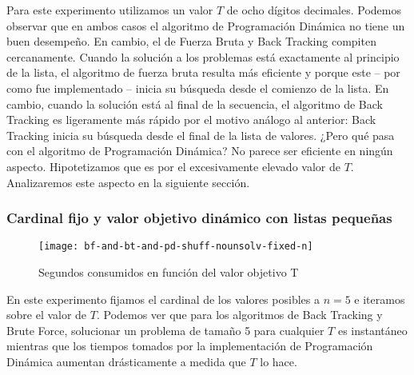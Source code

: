 Para este experimento utilizamos un valor $T$ de ocho dígitos decimales. Podemos observar que en ambos casos el algoritmo de Programación Dinámica no tiene un buen desempeño. En cambio, el de Fuerza Bruta y Back Tracking compiten cercanamente. Cuando la solución a los problemas está exactamente al principio de la lista, el algoritmo de fuerza bruta resulta más eficiente y porque este – por como fue implementado – inicia su búsqueda desde el comienzo de la lista. En cambio, cuando la solución está al final de la secuencia, el algoritmo de Back Tracking es ligeramente más rápido por el motivo análogo al anterior: Back Tracking inicia su búsqueda desde el final de la lista de valores. ¿Pero qué pasa con el algoritmo de Programación Dinámica? No parece ser eficiente en ningún aspecto. Hipotetizamos que es por el excesivamente elevado valor de $T$. Analizaremos este aspecto en la siguiente sección.

\subsubsection{Cardinal fijo y valor objetivo dinámico con listas pequeñas}
\begin{figure}[H]
	\centering
	\texttt{[image: bf-and-bt-and-pd-shuff-nounsolv-fixed-n]}
	\caption{\footnotesize Segundos consumidos en función del valor objetivo T}
	\label{fig:bf-and-bt-and-pd}
\end{figure}
En este experimento fijamos el cardinal de los valores posibles a $n=5$ e iteramos sobre el valor de $T$. Podemos ver que para los algoritmos de Back Tracking y Brute Force, solucionar un problema de tamaño 5 para cualquier $T$ es instantáneo mientras que los tiempos tomados por la implementación de Programación Dinámica aumentan drásticamente a medida que $T$ lo hace.
